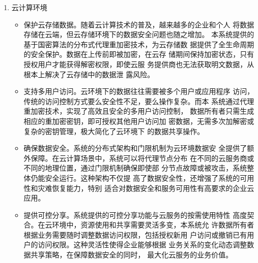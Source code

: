 \begin{enumerate}
\begin{itemize}
		      \item 支持动态权限调整。系统支持动态权限调整的特性与区块链的智能
		            合约机制结合，可以实现自动化、精确的数据访问控制。数据所有
		            者可以通过智能合约定义复杂的访问策略，如基于时间、条件或代
		            币支付的数据访问权限，当满足预设条件时，系统自动完成重加密
		            密钥的生成和分发，实现了权限管理的智能化和去中心化。

		      \item 优化数据共享机制。传统区块链中的数据共享往往需要链下协
		            商和多次交互，效率低下且安全风险高。而本系统通过代理重加
		            密技术，将数据共享过程简化为密钥生成和分发操作，大大提高了
		            效率，同时保证了安全性。这种优化对于需要频繁数据交换的区
		            块链应用，如分布式金融、跨境贸易等领域具有重要价值。
	      \end{itemize}

	\item 云计算环境
	      \begin{itemize}
		      \item 保护云存储数据。随着云计算技术的普及，越来越多的企业和个人
		            将数据存储在云端，但云存储环境下的数据安全问题也随之增加。
		            本系统提供的基于国密算法的分布式代理重加密技术，为云存储数
		            据提供了全生命周期的安全保护。数据在上传前即被加密，在云存
		            储期间保持加密状态，只有授权用户才能获得解密权限，即使云服
		            务提供商也无法获取明文数据，从根本上解决了云存储中的数据泄
		            露风险。

		      \item 支持多用户访问。云环境下的数据往往需要被多个用户或应用程序
		            访问，传统的访问控制方式要么安全性不足，要么操作复杂。而本
		            系统通过代理重加密技术，实现了高效且安全的多用户访问控制，
		            数据所有者只需生成相应的重加密密钥，即可授权其他用户访问加
		            密数据，无需多次加解密或复杂的密钥管理，极大简化了云环境下
		            的数据共享操作。

		      \item 确保数据安全。系统的分布式架构和门限机制为云环境数据安
		            全提供了额外保障。在云计算场景中，系统可以将代理节点分布
		            在不同的云服务商或不同的地理位置，通过门限机制确保即使部
		            分节点故障或被攻击，系统整体仍能安全运行。这种架构不仅提
		            高了数据安全性，还增强了系统的可用性和灾难恢复能力，特别
		            适合对数据安全和服务可用性有高要求的企业云应用。

		      \item 提供可控分享。系统提供的可控分享功能与云服务的按需使用特性
		            高度契合。在云环境中，资源使用和共享需要灵活多变，本系统允
		            许数据所有者根据业务需要随时调整数据访问权限，包括授权新用
		            户访问或撤销已有用户的访问权限。这种灵活性使得企业能够根据
		            业务关系的变化动态调整数据共享策略，在保障数据安全的同时，
		            最大化云服务的业务价值。
	      \end{itemize}
\end{enumerate}

